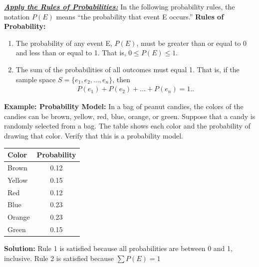 \documentclass{report}
\begin{document}
    \pagebreak \bigbreak \noindent
    \textbf{\textit{\underline{Apply the Rules of Probabilities:}}}
    \bigbreak \noindent 
    In the following probability rules, the notation $P(E)$ means “the probability that event E occurs.”
    \bigbreak \noindent 
    \textbf{Rules of Probability:}
    \begin{enumerate}
        \item The probability of any event E, $P(E)$, must be greater than or equal to 0 and less than or equal to 1. That is, $0 \leq P(E) \leq 1$.
        \item The sum of the probabilities of all outcomes must equal 1. That is, if the sample space $S = \{e_1, e_2, \dots, e_n\}$, then
            \begin{align*}
                P(e_1) + P(e_2) + \dots + P(e_n) = 1.
            .\end{align*}
    \end{enumerate}
    \bigbreak \noindent 
    \begin{mdframed}
      \textbf{Example: Probability Model:}
      \bigbreak \noindent 
      In a bag of peanut candies, the colors of the candies can be brown, yellow, red, blue, orange, or green. Suppose that a candy is randomly selected from a bag. The table shows each color and the probability of drawing that color. Verify that this is a probability model.
      \bigbreak \noindent 
      \begin{center}
          \begin{center}
              \begin{tabular}{|l|c|}
              \hline
              Color & Probability \\
              	\hline
               	 Brown  & 0.12  \\
              	\hline
              	 Yellow & 0.15 \\
              	 \hline 
              	 Red & 0.12 \\
              	 \hline
              	 Blue & 0.23 \\
              	 \hline
              	 Orange & 0.23 \\
              	 \hline
              	 Green & 0.15 \\
              	 \hline
              \end{tabular}
          \end{center}
      \end{center}
      \bigbreak \noindent 
      \textbf{Solution:}
      \bigbreak \noindent 
        Rule 1 is satisfied because all probabilities are between 0 and 1, inclusive.
          \bigbreak \noindent 
          Rule 2 is satisfied because $\sum P(E)= 1$
    \end{mdframed}
\end{document}
